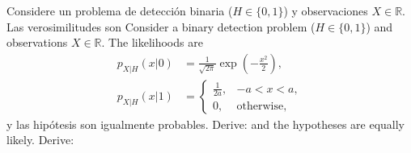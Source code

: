 
\question

\ifspanish
Considere un problema de detección binaria ($H \in \{0,1\}$) y observaciones $X \in \mathbb{R}$. Las verosimilitudes son
\else
Consider a binary detection problem ($H \in \{0,1\}$) and observations $X \in \mathbb{R}$. The likelihoods are
\fi
\begin{align*}
  p_{X|H}(x|0) &= \frac{1}{\sqrt{2 \pi}} \exp \left(- \frac{x^2}{2}\right), \\
  p_{X|H}(x|1) &= \begin{cases} \frac{1}{2 a}, & -a < x < a, \\ 0, & \text{otherwise}, \end{cases}
\end{align*}
\ifspanish 
y las hipótesis son igualmente probables. Derive:
\else
and the hypotheses are equally likely. Derive:
\fi

